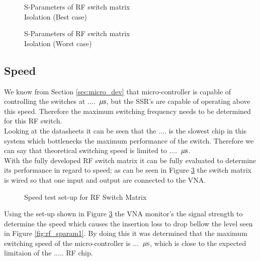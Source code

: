 \documentclass[12pt,openany,a4paper]{book}
\newcommand{\us}	{\ensuremath{\rm\,\mu s}}
\begin{document}




\begin{figure}[H]
	\centering
	\caption{S-Parameters of RF switch matrix\\ Isolation (Best case)}
	\label{fig:rf_sparam2}
\end{figure} 





\begin{figure}[H]
	\centering
	\caption{S-Parameters of RF switch matrix\\ Isolation (Worst case)}
	\label{fig:rf_sparam3}
\end{figure} 







\subsection{Speed}
We know from Section \ref{sec:micro_dev} that micro-controller is capable of controlling the switches at .... \us , but the SSR's are capable of operating above this speed. Therefore the maximum switching frequency needs to be determined for this RF switch. \\
Looking at the datasheets it can be seen that the .... is the slowest chip in this system which bottlenecks the maximum performance of the switch. Therefore we can say that theoretical switching speed is limited to .... \us . \\[0.3cm]
With the fully developed RF switch matrix it can be fully evaluated to determine its performance in regard to speed; as can be seen in Figure \ref{fig:speedtest} the switch matrix is wired so that one input and output are connected to the VNA.
\begin{figure}[H]
	\centering
	\caption{Speed test set-up for RF Switch Matrix}
	\label{fig:speedtest}
\end{figure} 
Using the set-up shown in Figure \ref{fig:speedtest} the VNA monitor's the signal strength to determine the speed which causes the insertion loss to drop bellow the level seen in Figure \ref{fig:rf_sparam1}. By doing this it was determined that the maximum switching speed of the micro-controller is ... \us , which is close to the expected limitaion of the ..... RF chip.
\end{document}
